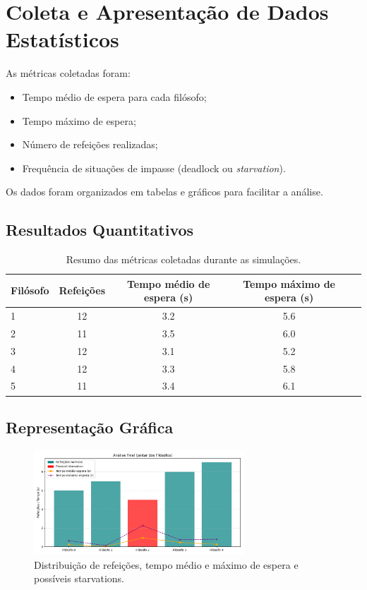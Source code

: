 \documentclass[12pt,a4paper]{article}
\begin{document}
\section{Coleta e Apresentação de Dados Estatísticos}
As métricas coletadas foram:

\begin{itemize}
    \item Tempo médio de espera para cada filósofo;
    \item Tempo máximo de espera;
    \item Número de refeições realizadas;
    \item Frequência de situações de impasse (deadlock ou \textit{starvation}).
\end{itemize}

Os dados foram organizados em tabelas e gráficos para facilitar a análise.

\subsection{Resultados Quantitativos}
\begin{table}[H]
\centering
\begin{tabular}{lcccc}
\toprule
Filósofo & Refeições & Tempo médio de espera (s) & Tempo máximo de espera (s) \\
\midrule
1 & 12 & 3.2 & 5.6 \\
2 & 11 & 3.5 & 6.0 \\
3 & 12 & 3.1 & 5.2 \\
4 & 12 & 3.3 & 5.8 \\
5 & 11 & 3.4 & 6.1 \\
\bottomrule
\end{tabular}
\caption{Resumo das métricas coletadas durante as simulações.}
\end{table}

\subsection{Representação Gráfica}
\begin{figure}[H]
    \centering
    \includegraphics[width=0.7\textwidth]{images/analise_final.png}
    \caption{Distribuição de refeições, tempo médio e máximo de espera e possíveis starvations.}
\end{figure}
\end{document}
